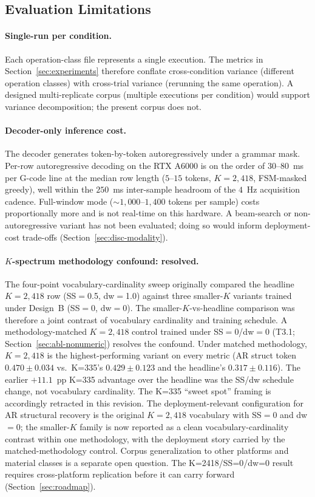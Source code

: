 \documentclass[sensors,article,submit,moreauthors,pdftex]{Definitions/mdpi}
\begin{document}
\subsection{Evaluation Limitations}
\label{sec:lim-eval}

\paragraph{Single-run per condition.} Each operation-class file represents a single execution. The metrics in Section~\ref{sec:experiments} therefore conflate cross-condition variance (different operation classes) with cross-trial variance (rerunning the same operation). A designed multi-replicate corpus (multiple executions per condition) would support variance decomposition; the present corpus does not.

\paragraph{Decoder-only inference cost.} The decoder generates token-by-token autoregressively under a grammar mask. Per-row autoregressive decoding on the RTX A6000 is on the order of $30$--$80$~ms per G-code line at the median row length ($5$--$15$ tokens, $K\!=\!2{,}418$, FSM-masked greedy), well within the $250$~ms inter-sample headroom of the $4$~Hz acquisition cadence. Full-window mode ($\sim$$1{,}000$--$1{,}400$ tokens per sample) costs proportionally more and is not real-time on this hardware. A beam-search or non-autoregressive variant has not been evaluated; doing so would inform deployment-cost trade-offs (Section~\ref{sec:disc-modality}).

\paragraph{$K$-spectrum methodology confound: resolved.} The four-point vocabulary-cardinality sweep originally compared the headline $K\!=\!2{,}418$ row (SS$=$0.5, dw$=$1.0) against three smaller-$K$ variants trained under Design~B (SS$=$0, dw$=$0). The smaller-$K$-vs-headline comparison was therefore a joint contrast of vocabulary cardinality and training schedule. A methodology-matched $K\!=\!2{,}418$ control trained under SS$=$0/dw$=$0 (T3.1; Section~\ref{sec:abl-nonumeric}) resolves the confound. Under matched methodology, $K\!=\!2{,}418$ is the highest-performing variant on every metric (AR struct token $0.470 \pm 0.034$ vs.\ K=335's $0.429 \pm 0.123$ and the headline's $0.317 \pm 0.116$). The earlier $+11.1$~pp K=335 advantage over the headline was the SS/dw schedule change, not vocabulary cardinality. The K=335 ``sweet spot'' framing is accordingly retracted in this revision. The deployment-relevant configuration for AR structural recovery is the original $K\!=\!2{,}418$ vocabulary with SS$=$0 and dw$=$0; the smaller-$K$ family is now reported as a clean vocabulary-cardinality contrast within one methodology, with the deployment story carried by the matched-methodology control. Corpus generalization to other platforms and material classes is a separate open question. The K=2418/SS=0/dw=0 result requires cross-platform replication before it can carry forward (Section~\ref{sec:roadmap}).
\end{document}
